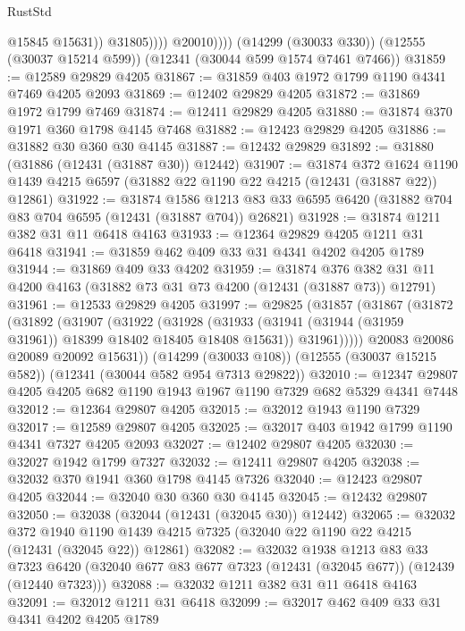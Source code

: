 \begin{lexlean}{RustStd}
\begin{coremodule}
                        @15845
                        @15631))
                    @31805))))
            @20010))))
    (@14299 (@30033 @330))
    (@12555 (@30037 @15214 @599))
    (@12341 (@30044 @599 @1574 @7461 @7466))
@31859 := @12589 @29829 @4205
@31867 := @31859 @403 @1972 @1799 @1190 @4341 @7469 @4205 @2093
@31869 := @12402 @29829 @4205
@31872 := @31869 @1972 @1799 @7469
@31874 := @12411 @29829 @4205
@31880 := @31874 @370 @1971 @360 @1798 @4145 @7468
@31882 := @12423 @29829 @4205
@31886 := @31882 @30 @360 @30 @4145
@31887 := @12432 @29829
@31892 := @31880 (@31886 (@12431 (@31887 @30)) @12442)
@31907 := @31874
    @372
    @1624
    @1190
    @1439
    @4215
    @6597
    (@31882 @22 @1190 @22 @4215 (@12431 (@31887 @22)) @12861)
@31922 := @31874
    @1586
    @1213
    @83
    @33
    @6595
    @6420
    (@31882 @704 @83 @704 @6595 (@12431 (@31887 @704)) @26821)
@31928 := @31874 @1211 @382 @31 @11 @6418 @4163
@31933 := @12364 @29829 @4205 @1211 @31 @6418
@31941 := @31859 @462 @409 @33 @31 @4341 @4202 @4205 @1789
@31944 := @31869 @409 @33 @4202
@31959 := @31874
    @376
    @382
    @31
    @11
    @4200
    @4163
    (@31882 @73 @31 @73 @4200 (@12431 (@31887 @73)) @12791)
@31961 := @12533 @29829 @4205
@31997 := @29825
    (@31857
      (@31867
        (@31872
          (@31892
            (@31907
              (@31922
                (@31928
                  (@31933 (@31941 (@31944 (@31959 @31961)) @18399 @18402 @18405 @18408 @15631))
                  @31961)))))
        @20083
        @20086
        @20089
        @20092
        @15631))
    (@14299 (@30033 @108))
    (@12555 (@30037 @15215 @582))
    (@12341 (@30044 @582 @954 @7313 @29822))
@32010 := @12347 @29807 @4205 @4205 @682 @1190 @1943 @1967 @1190 @7329 @682 @5329 @4341 @7448
@32012 := @12364 @29807 @4205
@32015 := @32012 @1943 @1190 @7329
@32017 := @12589 @29807 @4205
@32025 := @32017 @403 @1942 @1799 @1190 @4341 @7327 @4205 @2093
@32027 := @12402 @29807 @4205
@32030 := @32027 @1942 @1799 @7327
@32032 := @12411 @29807 @4205
@32038 := @32032 @370 @1941 @360 @1798 @4145 @7326
@32040 := @12423 @29807 @4205
@32044 := @32040 @30 @360 @30 @4145
@32045 := @12432 @29807
@32050 := @32038 (@32044 (@12431 (@32045 @30)) @12442)
@32065 := @32032
    @372
    @1940
    @1190
    @1439
    @4215
    @7325
    (@32040 @22 @1190 @22 @4215 (@12431 (@32045 @22)) @12861)
@32082 := @32032
    @1938
    @1213
    @83
    @33
    @7323
    @6420
    (@32040 @677 @83 @677 @7323 (@12431 (@32045 @677)) (@12439 (@12440 @7323)))
@32088 := @32032 @1211 @382 @31 @11 @6418 @4163
@32091 := @32012 @1211 @31 @6418
@32099 := @32017 @462 @409 @33 @31 @4341 @4202 @4205 @1789

\end{coremodule}
\end{lexlean}
